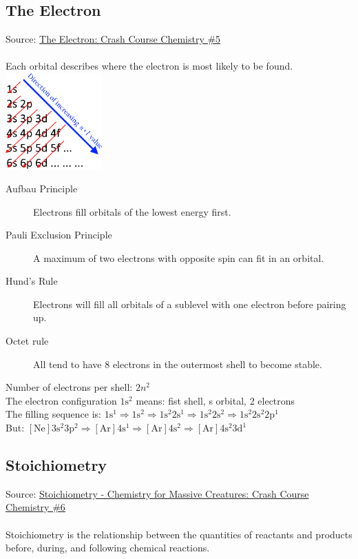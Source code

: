 \subsection{The Electron}
Source: \href{https://www.youtube.com/watch?v=rcKilE9CdaA&list=PL8dPuuaLjXtPHzzYuWy6fYEaX9mQQ8oGr&index=6}{The Electron: Crash Course Chemistry \#5}
\\\\
Each orbital describes where the electron is most likely to be found.
\\
\includegraphics[width=10em]{./includes/chemistry/imgs/Aufbau_Principle.png}

\begin{description}
    \item[Aufbau Principle] Electrons fill orbitals of the lowest energy first.
    \item[Pauli Exclusion Principle] A maximum of two electrons with opposite spin can fit in an orbital.
    \item[Hund's Rule] Electrons will fill all orbitals of a sublevel with one electron before pairing up.
    \item[Octet rule] All tend to have 8 electrons in the outermost shell to become stable.
\end{description}
%
Number of electrons per shell: $2n^2$\\ 
The electron configuration $1\text{s}^2$ means: fist shell, s orbital, 2 electrons\\
The filling sequence is: $1\text{s}^1 \Rightarrow 1\text{s}^2 \Rightarrow 
1\text{s}^2 2\text{s}^1 \Rightarrow 1\text{s}^2 2\text{s}^ 2\Rightarrow 
1\text{s}^2 2\text{s}^2 2\text{p}^1$\\
But: $[\text{Ne}] 3\text{s}^2 3\text{p}^2 \Rightarrow [\text{Ar}] 4\text{s}^1 
\Rightarrow [\text{Ar}] 4\text{s}^2 \Rightarrow [\text{Ar}] 4\text{s}^2 3\text{d}^1$

\subsection{Stoichiometry}
Source: \href{https://www.youtube.com/watch?v=UL1jmJaUkaQ&list=PL8dPuuaLjXtPHzzYuWy6fYEaX9mQQ8oGr&index=7}{Stoichiometry - Chemistry for Massive Creatures: Crash Course Chemistry \#6}
\\\\
Stoichiometry is the relationship between the quantities of reactants and products before, during, and following chemical reactions.

